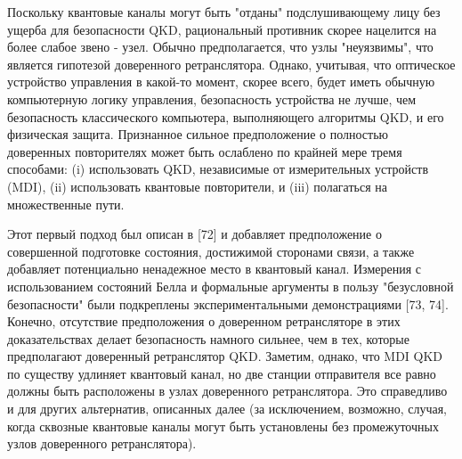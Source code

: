 Поскольку квантовые каналы могут быть "отданы" подслушивающему лицу без ущерба для безопасности QKD, рациональный противник скорее нацелится на более слабое звено - узел. Обычно предполагается, что узлы "неуязвимы", что является гипотезой доверенного ретранслятора. Однако, учитывая, что оптическое устройство управления в какой-то момент, скорее всего, будет иметь обычную компьютерную логику управления, безопасность устройства не лучше, чем безопасность классического компьютера, выполняющего алгоритмы QKD, и его физическая защита.
Признанное сильное предположение о полностью доверенных повторителях может быть ослаблено по крайней мере тремя способами: (i) использовать QKD, независимые от измерительных устройств (MDI), (ii) использовать квантовые повторители, и (iii) полагаться на множественные пути.

Этот первый подход был описан в [72] и добавляет предположение о совершенной подготовке состояния, достижимой сторонами связи, а также добавляет потенциально ненадежное место в квантовый канал. Измерения с использованием состояний Белла и формальные аргументы в пользу "безусловной безопасности" были подкреплены экспериментальными демонстрациями [73, 74]. Конечно, отсутствие предположения о доверенном ретрансляторе в этих доказательствах делает безопасность намного сильнее, чем в тех, которые предполагают доверенный ретранслятор QKD. Заметим, однако, что MDI QKD по существу удлиняет квантовый канал, но две станции отправителя все равно должны быть расположены в узлах доверенного ретранслятора. Это справедливо и для других альтернатив, описанных далее (за исключением, возможно, случая, когда сквозные квантовые каналы могут быть установлены без промежуточных узлов доверенного ретранслятора).

